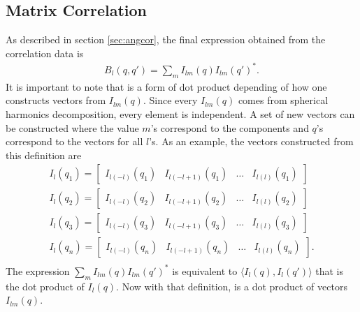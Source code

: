 \subsection{Matrix Correlation}
As described in section \ref{sec:angcor}, the final expression obtained from the correlation data is
\begin{eqnarray}
B_{l}(q,q')=\sum_{m} I_{lm}(q) I_{lm}(q')^{*}. 
\end{eqnarray}
It is important to note that \Blq is a form of dot product depending of how one constructs vectors from $I_{lm}(q)$. Since every $I_{lm}(q)$ comes from spherical harmonics decomposition, every element is independent. A set of new vectors can be constructed where the value $m$'s correspond to the components and $q$'s correspond to the vectors for all $l$'s. As an example, the vectors constructed from this definition are
\begin{eqnarray}
I_{l}(q_1)=
\begin{bmatrix}
I_{l(-l)}(q_1)&I_{l(-l+1)}(q_1) & \ldots &I_{l(l)}(q_1)
\end{bmatrix}\\ \nonumber
I_{l}(q_2)=
\begin{bmatrix}
I_{l(-l)}(q_2)&I_{l(-l+1)}(q_2) & \ldots &I_{l(l)}(q_2)
\end{bmatrix}\\ \nonumber
I_{l}(q_3)=
\begin{bmatrix}
I_{l(-l)}(q_3)&I_{l(-l+1)}(q_3) & \ldots &I_{l(l)}(q_3)
\end{bmatrix}\\ \nonumber
I_{l}(q_n)=
\begin{bmatrix}
I_{l(-l)}(q_n)&I_{l(-l+1)}(q_n) & \ldots &I_{l(l)}(q_n)
\end{bmatrix}.\\ \nonumber
\end{eqnarray}
The expression $\sum_{m} I_{lm}(q) I_{lm}(q')^{*}$ is equivalent to $ \langle I_{l}(q) , I_{l}(q') \rangle$ that is the dot product of $I_{l}(q)$. Now with that definition, \Blq is a dot product of vectors $I_{lm}(q)$. 

